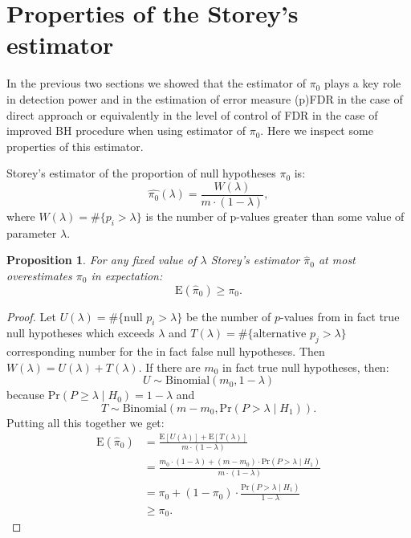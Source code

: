 \documentclass[10pt]{article}
\newtheorem{proposition}[theorem]{Proposition}
\begin{document}
\section{Properties of the Storey's estimator} \label{sec: properties}

In the previous two sections we showed that the estimator of $\pi_{0}$ plays a key role in detection power and in the estimation of error measure (p)FDR in the case of direct approach or equivalently in the level of control of FDR in the case of improved BH procedure when using estimator of $\pi_{0}$. Here we inspect some properties of this estimator.

Storey's estimator of the proportion of null hypotheses $\pi_{0}$ is:
\begin{equation}
\widehat{\pi_{0}}(\lambda) = \frac{W(\lambda)}{m \cdot (1-\lambda)},
\end{equation}
where $W(\lambda) = \# \lbrace p_{i} > \lambda \rbrace$ is the number of p-values greater than some value of parameter $\lambda$.

\begin{proposition}
	For any fixed value of $\lambda$ Storey's estimator $\widehat{\pi}_{0}$ at most overestimates $\pi_{0}$ in expectation:
	\begin{equation}
		\text{E}(\widehat{\pi}_{0}) \geq \pi_{0}.
	\end{equation}
\end{proposition}
\begin{proof}
	Let $U(\lambda) = \# \lbrace \text{null } p_{i} > \lambda \rbrace$ be the number of $p$-values from in fact true null hypotheses which exceeds $\lambda$ and $T(\lambda) = \# \lbrace \text{alternative } p_{j} > \lambda \rbrace$ corresponding number for the in fact false null hypotheses. Then $W(\lambda) = U(\lambda) + T(\lambda)$. If there are $m_{0}$ in fact true null hypotheses, then:
	\begin{equation}
		U \sim \text{Binomial}(m_{0}, 1 - \lambda)
	\end{equation}
	because $\text{Pr}(P \geq \lambda \mid H_{0}) = 1 - \lambda$ and
	\begin{equation}
		T \sim \text{Binomial}\left( m - m_{0}, \text{Pr}(P > \lambda \mid H_{1}) \right).
	\end{equation}
	Putting all this together we get:
	\begin{align}  %
		\text{E}(\widehat{\pi}_{0}) 
		&= \frac{ \text{E} \left[ U(\lambda)\right] + \text{E}\left[ T(\lambda) \right] }{m \cdot (1-\lambda)} \\
		&= \frac{m_{0} \cdot (1 - \lambda) + (m - m_{0}) \cdot \text{Pr}(P > \lambda \mid H_{1})}{m \cdot (1 - \lambda)}  \\
		&= \pi_{0} + (1 - \pi_{0}) \cdot \frac{\text{Pr}(P > \lambda \mid H_{1})}{1 - \lambda}  \label{eq: bias} \\
		&\geq \pi_{0}.
	\end{align}
\end{proof}
\end{document}
